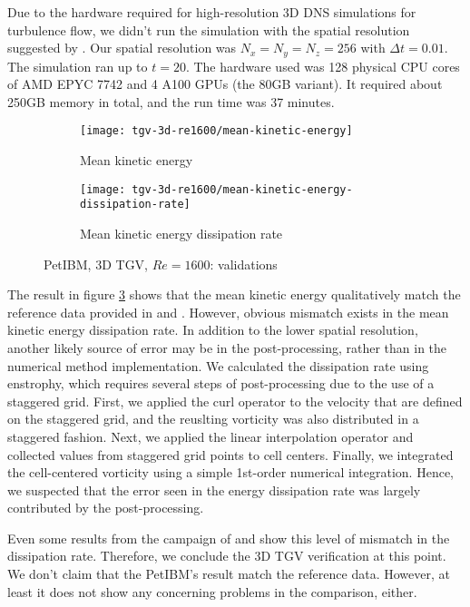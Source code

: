 Due to the hardware required for high-resolution 3D DNS simulations for turbulence flow, we didn't run the simulation with the spatial resolution suggested by \cite{noauthor_1st_2012}.
Our spatial resolution was $N_x=N_y=N_z=256$ with $\Delta t=0.01$.
The simulation ran up to $t=20$.
The hardware used was 128 physical CPU cores of AMD EPYC 7742 and 4 A100 GPUs (the 80GB variant).
It required about 250GB memory in total, and the run time was 37 minutes.

\begin{figure}[H]
    \centering
    \begin{subfigure}[b]{0.45\textwidth}
        \centering
        \texttt{[image: tgv-3d-re1600/mean-kinetic-energy]}
        \caption{Mean kinetic energy}
        \label{fig:petibm-tgv3d-re1600-mean-energy}
    \end{subfigure}
    \hfill
    \begin{subfigure}[b]{0.45\textwidth}
        \centering
        \texttt{[image: tgv-3d-re1600/mean-kinetic-energy-dissipation-rate]}
        \caption{Mean kinetic energy dissipation rate}
        \label{fig:petibm-tgv3d-re1600-mean-energy-dissp}
    \end{subfigure}
    \caption{PetIBM, 3D TGV, $Re=1600$: validations}
    \label{fig:petibm-tgv3d-re1600-val}
\end{figure}

The result in figure \ref{fig:petibm-tgv3d-re1600-val} shows that the mean kinetic energy qualitatively match the reference data provided in \cite{noauthor_1st_2012} and \cite{debonis_solutions_2013}.
However, obvious mismatch exists in the mean kinetic energy dissipation rate.
In addition to the lower spatial resolution, another likely source of error may be in the post-processing, rather than in the numerical method implementation.
We calculated the dissipation rate using enstrophy, which requires several steps of post-processing due to the use of a staggered grid.
First, we applied the curl operator to the velocity that are defined on the staggered grid, and the reuslting vorticity was also distributed in a staggered fashion.
Next, we applied the linear interpolation operator and collected values from staggered grid points to cell centers.
Finally, we integrated the cell-centered vorticity using a simple 1st-order numerical integration.
Hence, we suspected that the error seen in the energy dissipation rate was largely contributed by the post-processing.

Even some results from the campaign of \cite{noauthor_1st_2012} and \cite{debonis_solutions_2013} show this level of mismatch in the dissipation rate.
Therefore, we conclude the 3D TGV verification at this point.
We don't claim that the PetIBM's result match the reference data.
However, at least it does not show any concerning problems in the comparison, either.

